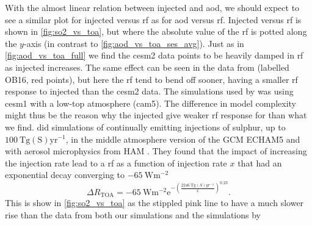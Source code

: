 \documentclass{ametsocV5}
\newcommand{\iso}[1][i]{{#1}njected \ce{SO2}}
\begin{document}

With the almost linear relation between injected  and \ac{aod}, we should expect
to see a similar plot for \iso{} versus \ac{rf} as for \ac{aod} versus \ac{rf}. \iso[I]
versus \ac{rf} is shown in \cref{fig:so2_vs_toa}, but where the absolute value of the
\ac{rf} is potted along the \(y\)-axis (in contrast to \cref{fig:aod_vs_toa_ses_avg}).
Just as in \cref{fig:aod_vs_toa_full} we find the \ac{cesm2} data points to be heavily
damped in \ac{rf} as \iso{} increases. The same effect can be seen in the data from
\citet{ottobliesner2016} (labelled OB16, red points), but here the \ac{rf} tend to bend
off sooner, having a smaller \ac{rf} response to \iso{} than the \ac{cesm2} data. The
simulations used by \citet{ottobliesner2016} was using \ac{cesm1} with a low-top
atmosphere (\ac{cam5}). The difference in model complexity might thus be the reason why
the \iso{} give weaker \ac{rf} response for \citet{ottobliesner2016} than what we find.
\citet{niemeier2015} did simulations of continually emitting injections of sulphur, up
to \(\SI{100}{\tera\gram \mathrm{(S)}\mathrm{yr}^{-1}}\), in the middle atmosphere
version of the GCM ECHAM5 \citep{giorgetta2006} and with aerosol microphysics from HAM
\citep{stier2005}. They found that the impact of increasing the injection rate lead to a
\ac{rf} as a function of injection rate \(x\) that had an exponential decay converging
to \(\SI{-65}{\watt\meter^{-2}}\)
\begin{equation}
  \Delta
  R_{\mathrm{TOA}} =
  -\SI{65}{\watt\metre^{-2}}
  \mathrm{e}^{-{\left(\frac{\SI{2246}{\tera\gram(S)yr^{-1}}}{x}\right)}^{0.23}}.
  \label{eq:niemeier_exponential}
\end{equation}
%
This is show in \cref{fig:so2_vs_toa} as the stippled pink line to have a much slower
rise than the data from both our simulations and the simulations by
\end{document}
